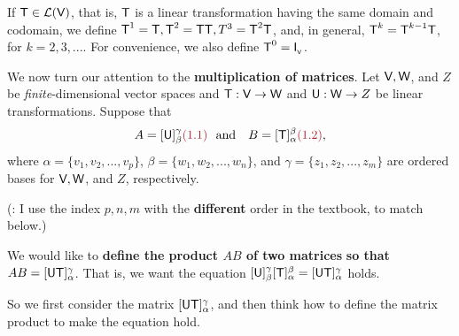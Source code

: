 \begin{additional definition} \label{adef 2.6}
If \(\textsf{T} \in \mathcal{L}(\textsf{V})\), that is, \(\textsf{T}\) is a linear transformation having the same domain and codomain, we define \(\textsf{T}^1 = \textsf{T}, \textsf{T}^2 = \textsf{T}\textsf{T}, T^3 = \textsf{T}^2\textsf{T}\),
and, in general, \(\textsf{T}^k = \textsf{T}^{k - 1}\textsf{T}\), for \(k = 2,3, ...\).
For convenience, we also define \(\textsf{T}^0 = \textsf{I}_{_{\textsf{V}}}\).
\end{additional definition}

We now turn our attention to the \textbf{multiplication of matrices}.
Let \(\textsf{V}, \textsf{W}\), and \(Z\) be \emph{finite}-dimensional vector spaces and \(\textsf{T} : \textsf{V} \to \textsf{W}\) and \(\textsf{U}: \textsf{W} \to Z\) be linear transformations.
Suppose that
\[
    A = [\U]_{\beta}^{\gamma} \MAROON{(1.1)} \text{\ \  and \ \ } B = [\T]_{\alpha}^{\beta} \MAROON{(1.2)},
\]
where \(\alpha = \{v_1, v_2, ... , v_p\}\), \(\beta = \{ w_1, w_2, ..., w_n \}\), and \(\gamma = \{ z_1, z_2, ..., z_m \}\) are ordered bases for \(\textsf{V}, \textsf{W}\), and \(Z\), respectively.

(: I use the index \(p, n, m\) with the \textbf{different} order in the textbook, to match  below.)

We would like to \textbf{define the product \(AB\) of two matrices} \textbf{so that \(AB = [\textsf{U}\textsf{T}]_{\alpha}^{\gamma}\)}.
That is, we want the equation \([\textsf{U}]_{\beta}^{\gamma}[\textsf{T}]_{\alpha}^{\beta} = [\textsf{U}\textsf{T}]_{\alpha}^{\gamma}\) holds.

So we first consider the matrix \([\textsf{U}\textsf{T}]_{\alpha}^{\gamma}\), and then think how to define the matrix product to make the equation hold.

